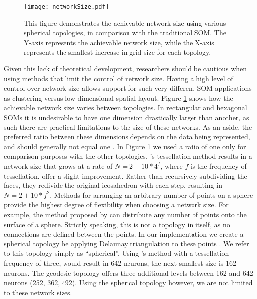 \begin{figure}[htb]
\centering
\texttt{[image: networkSize.pdf]}
\caption{This figure demonstrates the achievable network size using various
spherical topologies, in comparison with the traditional SOM. The Y-axis
represents the achievable network size, while the X-axis represents the
smallest increase in grid size for each topology.}
\label{fig:nSize}
\end{figure}

Given this lack of theoretical development, researchers should be cautious
when using methods that limit the control of network size.  Having a high
level of control over network size allows support for such very different SOM
applications as clustering versus low-dimensional spatial layout.
Figure \ref{fig:nSize} shows how the achievable network size varies between
topologies.  In rectangular and hexagonal SOMs it is undesirable to have one dimension
drastically larger than another, as such there are practical limitations to
the size of these networks.  As an aside, the preferred ratio between these
dimensions depends on the data being represented, and should generally not
equal one \citep{kohonen1996, toolbox}.  In Figure \ref{fig:nSize} we used a
ratio of one only for comparison purposes with the other topologies.
\citeauthor{ritter99}'s tessellation method results in a network size that
grows at a rate of \(N=2+10*4^f\), where $f$ is the frequency of tessellation.
\cite{wu2006} offer a slight improvement. Rather than recursively subdividing
the faces, they redivide the original icosahedron with each step, resulting in
\(N=2+10*f^2\).  Methods for arranging an arbitrary number of points on a
sphere provide the highest degree of flexibility when choosing a network
size.  For example, the method proposed by \cite{Rakhmanov94} can
distribute any number of points onto the surface of a sphere.  Strictly
speaking, this is not a topology in itself, as no connections are defined
between the points. In our implementation we create a spherical topology be
applying Delaunay triangulation to these points \citep{Ranka97}.  We refer to
this topology simply as ``spherical''. Using \citeauthor{ritter99}'s method
with a tessellation frequency of three, would result in 642 neurons, the next
smallest size is 162 neurons.  The geodesic topology offers three additional
levels between 162 and 642 neurons (252, 362, 492).  Using the spherical
topology however, we are not limited to these network sizes.

